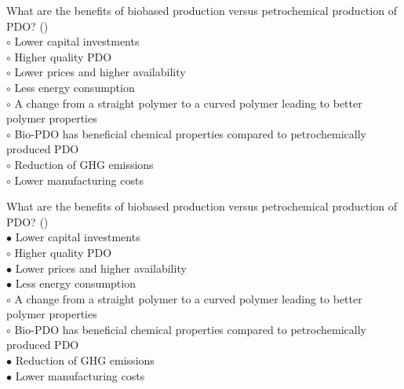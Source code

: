 \documentclass[]{beamer}
\begin{document}
\begin{CJK}{UTF8}{gbsn}
\begin{frame}[shrink] {}
\addtocounter{questions}{1}
\color{blue}
What are the benefits of biobased production versus petrochemical production of PDO?
({})\\
\color{black}
\setlength{\parindent}{-0.4cm}
{\color{red}$\circ$}  Lower capital investments  \\
{\color{red}$\circ$} Higher quality PDO   \\
{\color{red}$\circ$}  Lower prices and higher availability  \\
{\color{red}$\circ$}  Less energy consumption  \\
{\color{red}$\circ$} A change from a straight polymer to a curved polymer leading to better polymer properties  \\
{\color{red}$\circ$} Bio-PDO has beneficial chemical properties compared to petrochemically produced PDO  \\
{\color{red}$\circ$}  Reduction of GHG emissions  \\
{\color{red}$\circ$}  Lower manufacturing costs  \\
\end{frame}
\begin{frame}[shrink] {}
\addtocounter{answers}{1}
\color{blue}
What are the benefits of biobased production versus petrochemical production of PDO?
({})\\
\color{black}
\setlength{\parindent}{-0.4cm}
{\color{red}$\bullet$} Lower capital investments  \\
{\color{red}$\circ$} Higher quality PDO   \\
{\color{red}$\bullet$} Lower prices and higher availability  \\
{\color{red}$\bullet$} Less energy consumption  \\
{\color{red}$\circ$} A change from a straight polymer to a curved polymer leading to better polymer properties  \\
{\color{red}$\circ$} Bio-PDO has beneficial chemical properties compared to petrochemically produced PDO  \\
{\color{red}$\bullet$} Reduction of GHG emissions  \\
{\color{red}$\bullet$} Lower manufacturing costs  \\
\end{frame}



\end{CJK}
\end{document}
